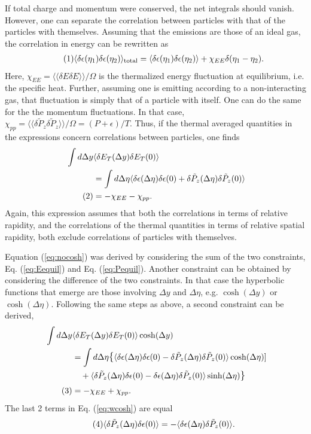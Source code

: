 \documentclass[12pt]{article}
\numberwithin{equation}{section}
\numberwithin{figure}{section}
\newcommand\eqnumber{\addtocounter{equation}{1}\tag{\theequation}}
\begin{document}
If total charge and momentum were conserved, the net integrals should vanish. However, one can separate the correlation between particles with that of the particles with themselves. Assuming that the emissions are those of an ideal gas, the correlation in energy can be rewritten as
\begin{align*}\eqnumber
\langle \delta\epsilon(\eta_1)\delta\epsilon(\eta_2)\rangle_{\rm total}
=\langle \delta\epsilon(\eta_1)\delta\epsilon(\eta_2)\rangle+\chi_{EE}\delta(\eta_1-\eta_2).
\end{align*}
Here, $\chi_{EE}=\langle\langle \delta E\delta E\rangle\rangle/\Omega$ is the thermalized energy fluctuation at equilibrium, i.e. the specific heat. Further, assuming one is emitting according to a non-interacting gas, that fluctuation is simply that of a particle with itself. One can do the same for the the momentum fluctuations. In that case, $\chi_{pp}=\langle\langle \delta \tilde{P}_z\delta \tilde{P}_z\rangle\rangle/\Omega=(P+\epsilon)/T$. Thus, if the thermal averaged quantities in the expressions concern correlations between particles, one finds
\begin{align*}
\int d\Delta y&\langle \delta E_T(\Delta y)\delta E_T(0)\rangle\\
&=\int d\Delta\eta\langle \delta\epsilon(\Delta\eta)\delta\epsilon(0)+\delta\tilde{P}_z(\Delta\eta)\delta\tilde{P}_z(0)\rangle\\
\eqnumber\label{eq:nocosh}
&=-\chi_{EE}-\chi_{pp}.
\end{align*}
Again, this expression assumes that both the correlations in terms of relative rapidity, and the correlations of the thermal quantities in terms of relative spatial rapidity, both exclude correlations of particles with themselves.

Equation (\ref{eq:nocosh}) was derived by considering the sum of the two constraints, Eq. (\ref{eq:Eequil}) and Eq. (\ref{eq:Pequil}). Another constraint can be obtained by considering the difference of the two constraints. In that case the hyperbolic functions that emerge are those involving $\Delta y$ and $\Delta\eta$, e.g. $\cosh(\Delta y)$ or $\cosh(\Delta\eta)$. Following the same steps as above, a second constraint can be derived,
\begin{align*}
\int d\Delta y &\langle \delta E_T(\Delta y)\delta E_T(0)\rangle\cosh(\Delta y)\\
&=\int d\Delta\eta\mathlarger{\{}\langle \delta\epsilon(\Delta\eta)\delta\epsilon(0)-\delta\tilde{P}_z(\Delta\eta)\delta\tilde{P}_z(0)\rangle\cosh(\Delta \eta)]\\
&~~~+\langle \delta\tilde{P}_z(\Delta\eta)\delta\epsilon(0)-\delta\epsilon(\Delta\eta)\delta\tilde{P}_z(0)\rangle\sinh(\Delta \eta)\mathlarger{\}}\\
\eqnumber\label{eq:wcosh}
&=-\chi_{EE}+\chi_{pp}.
\end{align*}
The last 2 terms in Eq. (\ref{eq:wcosh}) are equal
\begin{align*}\eqnumber
\langle\delta\tilde{P}_z(\Delta\eta)\delta\epsilon(0)\rangle=
-\langle\delta\epsilon(\Delta\eta)\delta\tilde{P}_z(0)\rangle.
\end{align*}
\end{document}

